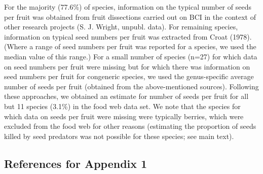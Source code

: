 \documentclass[11pt]{article}
\begin{document}
For the majority (77.6\%) of species, information on the typical number of seeds per fruit was obtained from fruit dissections carried out on BCI in the context of other research projects (S. J. Wright, unpubl. data). For remaining species, information on typical seed numbers per fruit was extracted from Croat (1978). (Where a range of seed numbers per fruit was reported for a species, we used the median value of this range.) For a small number of species (n=27) for which data on seed numbers per fruit were missing but for which there was information on seed numbers per fruit for congeneric species, we used the genus-specific average number of seeds per fruit (obtained from the above-mentioned sources). Following these approaches, we obtained an estimate for number of seeds per fruit for all but 11 species (3.1\%) in the food web data set. We note that the species for which data on seeds per fruit were missing were typically berries, which were excluded from the food web for other reasons (estimating the proportion of seeds killed by seed predators was not possible for these species; see main text).  

\subsection*{References for Appendix 1}
\end{document}
